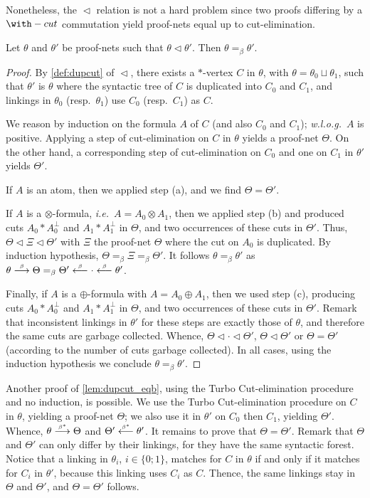\documentclass{lmcs}
\newcommand*{\orth}{^\perp} %
\newcommand*{\tens}{\otimes} %
\newcommand*{\ie}{\emph{i.e.}}
\newcommand*{\wolog}{\emph{w.l.o.g.}}
\newcommand*{\resp}{resp.}
\newcommand*{\eqeq}{=} %
\newcommand{\symboltext}[2]{\mathrel{\overset{\makebox[0pt]{\mbox{\normalfont\tiny\sffamily \ensuremath{#1}}}}{#2}}} %
\newcommand{\betato}{\symboltext{\beta}{\longrightarrow}}
\newcommand{\betafrom}{\symboltext{\beta}{\longleftarrow}}
\newcommand{\betatostar}{\symboltext{\beta^*}{\longrightarrow}}
\newcommand{\betafromstar}{\symboltext{\beta^*}{\longleftarrow}}
\newcommand{\dupcut}{\mathrel{\triangleleft}}
\newcommand{\eqb}{\mathrel{\eqeq_{\beta}}}
\begin{document}
Nonetheless, the $\dupcut$ relation is not a hard problem since two proofs differing by a $\with-cut$ commutation yield proof-nets equal up to cut-elimination.

\begin{lem}[$\dupcut~\subseteq~\eqb$]
\label{lem:dupcut_eqb}
Let $\theta$ and $\theta'$ be proof-nets such that $\theta\dupcut\theta'$.
Then $\theta\eqb\theta'$.
\end{lem}
\begin{proof}
By \autoref{def:dupcut} of $\dupcut$, there exists a $\ast$-vertex $C$ in $\theta$, with $\theta=\theta_0\sqcup\theta_1$, such that $\theta'$ is $\theta$ where the syntactic tree of $C$ is duplicated into $C_0$ and $C_1$, and linkings in $\theta_0$ (\resp\ $\theta_1$) use $C_0$ (\resp\ $C_1$) as $C$.

We reason by induction on the formula $A$ of $C$ (and also $C_0$ and $C_1$); \wolog\ $A$ is positive.
Applying a step of cut-elimination on $C$ in $\theta$ yields a proof-net $\Theta$.
On the other hand, a corresponding step of cut-elimination on $C_0$ and one on $C_1$ in $\theta'$ yields $\Theta'$.

If $A$ is an atom, then we applied step (a), and we find $\Theta=\Theta'$.

If $A$ is a $\tens$-formula, \ie\ $A=A_0\tens A_1$, then we applied step (b) and produced cuts $A_0\ast A_0\orth$ and $A_1\ast A_1\orth$ in $\Theta$, and two occurrences of these cuts in $\Theta'$.
Thus, $\Theta\dupcut\Xi\dupcut\Theta'$ with $\Xi$ the proof-net $\Theta$ where the cut on $A_0$ is duplicated.
By induction hypothesis, $\Theta\eqb\Xi\eqb\Theta'$.
It follows $\theta\eqb\theta'$ as $\theta\betato\Theta\eqb\Theta'\betafrom\cdot\betafrom\theta'$.

Finally, if $A$ is a $\oplus$-formula with $A=A_0\oplus A_1$, then we used step (c), producing cuts $A_0\ast A_0\orth$ and $A_1\ast A_1\orth$ in $\Theta$, and two occurrences of these cuts in $\Theta'$.
Remark that inconsistent linkings in $\theta'$ for these steps are exactly those of $\theta$, and therefore the same cuts are garbage collected.
Whence, $\Theta\dupcut\cdot\dupcut\Theta'$, $\Theta\dupcut\Theta'$ or $\Theta=\Theta'$ (according to the number of cuts garbage collected).
In all cases, using the induction hypothesis we conclude $\theta\eqb\theta'$.
\end{proof}

\begin{rem}
\label{rem:turbo_cut}
Another proof of \autoref{lem:dupcut_eqb}, using the Turbo Cut-elimination procedure and no induction, is possible.
We use the Turbo Cut-elimination procedure on $C$ in $\theta$, yielding a proof-net $\Theta$; we also use it in $\theta'$ on $C_0$ then $C_1$, yielding $\Theta'$.
Whence, $\theta\betatostar\Theta$ and $\Theta'\betafromstar\theta'$.
It remains to prove that $\Theta=\Theta'$.
Remark that $\Theta$ and $\Theta'$ can only differ by their linkings, for they have the same syntactic forest.
Notice that a linking in $\theta_i$, $i\in\{0;1\}$, matches for $C$ in $\theta$ if and only if it matches for $C_i$ in $\theta'$, because this linking uses $C_i$ as $C$.
Thence, the same linkings stay in $\Theta$ and $\Theta'$, and $\Theta=\Theta'$ follows.
\end{rem}
\end{document}

